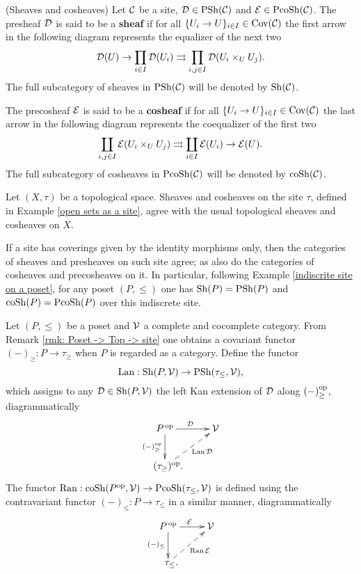 \documentclass[main.tex]{subfiles}
\begin{document}
\begin{definition}(Sheaves and cosheaves)
Let $\operatorname{\mathcal{C}}$ be a site, $\operatorname{\mathcal{D}}\in\operatorname{PSh}(\operatorname{\mathcal{C}})$ and $\operatorname{\mathcal{E}}\in\operatorname{PcoSh}(\operatorname{\mathcal{C}})$. The presheaf $\operatorname{\mathcal{D}}$ is said to be a \textbf{sheaf} if for all $\{U_i\to U\}_{i\in I}\in\operatorname{Cov}(\operatorname{\mathcal{C}})$ the first arrow in the following diagram represents the equalizer of the next two $$\operatorname{\mathcal{D}}(U)\to\prod_{i\in I}\operatorname{\mathcal{D}}(U_i)\rightrightarrows\prod_{i,j\in I}\operatorname{\mathcal{D}}(U_i\times_U U_j).$$ The full subcategory of sheaves in $\operatorname{PSh}(\operatorname{\mathcal{C}})$ will be denoted by $\operatorname{Sh}(\operatorname{\mathcal{C}})$.\par

The precosheaf $\operatorname{\mathcal{E}}$ is said to be a \textbf{cosheaf} if for all $\{U_i\to U\}_{i\in I}\in\operatorname{Cov}(\operatorname{\mathcal{C}})$ the last arrow in the following diagram represents the coequalizer of the first two $$\coprod_{i,j\in I}\operatorname{\mathcal{E}}(U_i\times_U U_j)\rightrightarrows\coprod_{i\in I}\operatorname{\mathcal{E}}(U_i)\to\operatorname{\mathcal{E}}(U).$$
The full subcategory of cosheaves in $\operatorname{PcoSh}(\operatorname{\mathcal{C}})$ will be denoted by $\operatorname{coSh}(\operatorname{\mathcal{C}})$.
\end{definition}

\begin{example}
Let $(X,\tau)$ be a topological space. Sheaves and cosheaves on the site $\tau$, defined in Example \ref{open sets as a site}, agree with the usual topological sheaves and cosheaves on $X$.
\end{example}

\begin{example}
If a site has coverings given by the identity morphisms only, then the categories of sheaves and presheaves on such site agree; as also do the categories of cosheaves and precosheaves on it. In particular, following Example \ref{indiscrite site on a poset}, for any poset $(P,\leq)$ one has $\operatorname{Sh}(P)=\operatorname{PSh}(P)$ and $\operatorname{coSh}(P)=\operatorname{PcoSh}(P)$ over this indiscrete site.
\end{example}

\begin{definition}
Let $(P,\leq)$ be a poset and $\operatorname{\mathcal{V}}$ a complete and cocomplete category. From Remark \ref{rmk: Poset -> Top -> site} one obtains a covariant functor $(-)_{\geq}:P\to\tau_\geq$ when $P$ is regarded as a category. Define the functor
$$\operatorname{Lan}:\operatorname{Sh}(P,\operatorname{\mathcal{V}})\to\operatorname{PSh}(\tau_{\leq},\operatorname{\mathcal{V}}),$$
which assigns to any $\operatorname{\mathcal{D}}\in\operatorname{Sh}(P,\operatorname{\mathcal{V}})$ the left Kan extension of $\operatorname{\mathcal{D}}$ along $(-)^{\mathrm{op}}_{\geq}$, diagrammatically
$$\xymatrix{P^{\,\op}\ar[r]^{\D}\ar[d]_{(-)^{\op}_\geq} & \V \\
\ \ (\tau_\geq)^{\op}. \ar@{-->}[ur]_-{\Lan\D} & }$$
The functor $\operatorname{Ran}:\operatorname{coSh}(P^{\mathrm{op}},\operatorname{\mathcal{V}})\to\operatorname{PcoSh}(\tau_{\leq},\operatorname{\mathcal{V}})$ is defined using the contravariant functor $(-)_{\leq}:P\to\tau_\leq$ in a similar manner, diagrammatically
$$\xymatrix{P^{\,\op}\ar[r]^{\E}\ar[d]_{(-)_\leq} & \V \\ \ \ \tau_\leq. \ar@{-->}[ur]_-{\Ran\E} & }$$
\end{definition}
\end{document}
